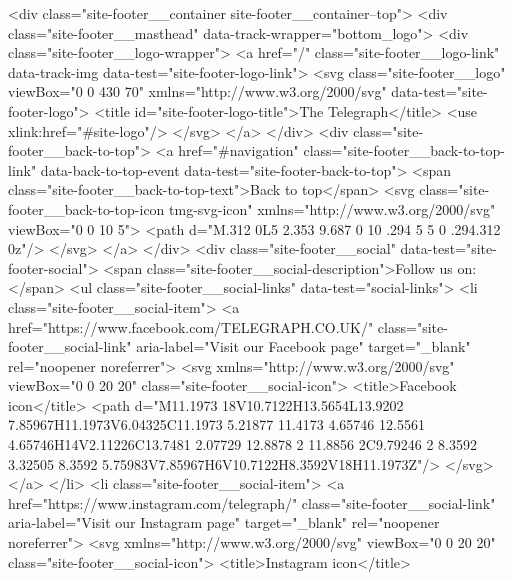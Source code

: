 {{{<div class="site-footer__container site-footer__container--top">
<div class="site-footer__masthead" data-track-wrapper="bottom_logo">
<div class="site-footer__logo-wrapper">
<a href="/" class="site-footer__logo-link" data-track-img data-test="site-footer-logo-link">
<svg class="site-footer__logo" viewBox="0 0 430 70" xmlns="http://www.w3.org/2000/svg" data-test="site-footer-logo">
<title id="site-footer-logo-title">The Telegraph</title>
<use xlink:href="#site-logo"/>
</svg>
</a>
</div>
<div class="site-footer__back-to-top">
<a href="#navigation" class="site-footer__back-to-top-link" data-back-to-top-event data-test="site-footer-back-to-top">
<span class="site-footer__back-to-top-text">Back to top</span>
<svg class="site-footer__back-to-top-icon  tmg-svg-icon" xmlns="http://www.w3.org/2000/svg" viewBox="0 0 10 5">
<path d="M.312 0L5 2.353 9.687 0 10 .294 5 5 0 .294.312 0z"/>
</svg>
</a>
</div>
<div class="site-footer__social" data-test="site-footer-social">
<span class="site-footer__social-description">Follow us on:</span>
<ul class="site-footer__social-links" data-test="social-links">
<li class="site-footer__social-item">
<a href="https://www.facebook.com/TELEGRAPH.CO.UK/" class="site-footer__social-link" aria-label="Visit our Facebook page" target="_blank" rel="noopener noreferrer">
<svg xmlns="http://www.w3.org/2000/svg" viewBox="0 0 20 20" class="site-footer__social-icon">
<title>Facebook icon</title>
<path d="M11.1973 18V10.7122H13.5654L13.9202 7.85967H11.1973V6.04325C11.1973 5.21877 11.4173 4.65746 12.5561 4.65746H14V2.11226C13.7481 2.07729 12.8878 2 11.8856 2C9.79246 2 8.3592 3.32505 8.3592 5.75983V7.85967H6V10.7122H8.3592V18H11.1973Z"/>
</svg>
</a>
</li>
<li class="site-footer__social-item">
<a href="https://www.instagram.com/telegraph/" class="site-footer__social-link" aria-label="Visit our Instagram page" target="_blank" rel="noopener noreferrer">
<svg xmlns="http://www.w3.org/2000/svg" viewBox="0 0 20 20" class="site-footer__social-icon">
<title>Instagram icon</title>
}}}
